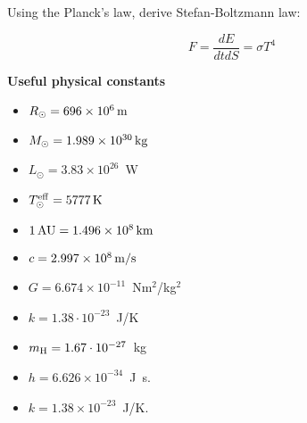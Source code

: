 \documentclass[12pt]{article}
\begin{document}
Using the Planck's law, derive Stefan-Boltzmann law:

\begin{equation}
F = \frac{dE}{dt dS} = \sigma T^4
\end{equation}

{\bf Useful physical constants}
\begin{itemize}
  \item $R_{\odot} = 696 \times 10^6\,{\rm m}$
  \item $M_{\odot} = 1.989 \times 10^{30}\,{\rm kg}$
  \item $L_{\odot} = 3.83 \times 10^{26}$~W
  \item $T^{\rm eff}_{\odot} = 5777\,{\rm K}$
  \item $1\,{\rm AU} = 1.496 \times 10^8\,{\rm km}$
  \item $c = 2.997 \times 10^8\,{\rm m/s}$
  \item $G = 6.674 \times 10^{-11}$~Nm$^2$/kg$^2$
  \item $k = 1.38\cdot10^{-23}$~J/K
  \item $m_{\rm H} = 1.67\cdot10^{-27}$~kg
  \item $h=6.626 \times 10^{-34}$~J~s.
  \item $k=1.38 \times 10^{-23}$~J/K.
\end{itemize}
\end{document}
